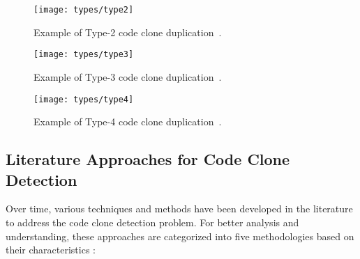\begin{figure}[ht]
\texttt{[image: types/type2]}
\caption{Example of Type-2 code clone duplication~\citep{litreview}.}
\label{fig:type2}
\end{figure}

\begin{figure}[ht]
\texttt{[image: types/type3]}
\caption{Example of Type-3 code clone duplication~\citep{litreview}.}
\label{fig:type3}
\end{figure}

\begin{figure}[ht]
\texttt{[image: types/type4]}
\caption{Example of Type-4 code clone duplication~\citep{litreview}.}
\label{fig:type4}
\end{figure}


\subsection{Literature Approaches for Code Clone Detection}

Over time, various techniques and methods have been developed in the literature
to address the code clone detection problem. For better analysis and
understanding, these approaches are categorized into five methodologies based
on their characteristics \citep{litreview}:

